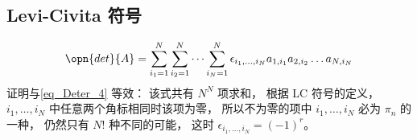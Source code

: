 \subsection{Levi-Civita 符号}
\begin{equation}
\opn{det}{A} = \sum_{i_1 = 1}^N \sum_{i_2 = 1}^N \dots \sum_{i_N = 1}^N \epsilon_{i_1, \dots, i_N} a_{1,i_1}a_{2,i_2}\dots a_{N,i_N}
\end{equation}
证明与\autoref{eq_Deter_4} 等效： 该式共有 $N^N$ 项求和， 根据 LC 符号的定义， $i_1, \dots, i_N$ 中任意两个角标相同时该项为零， 所以不为零的项中 $i_1, \dots, i_N$ 必为 $\pi_n$ 的一种， 仍然只有 $N!$ 种不同的可能， 这时 $\epsilon_{i_1, \dots, i_N} = (-1)^{r}$。
